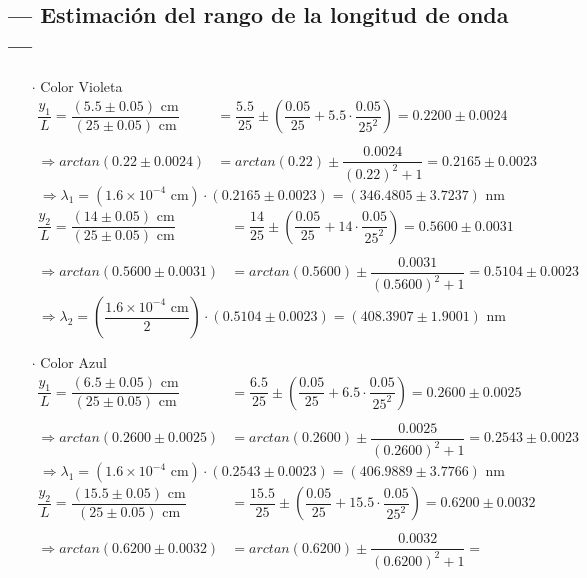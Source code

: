 \documentclass[12pt,a4paper]{article}
\begin{document}
\newpage

\subsection{--- Estimación del rango de la longitud de onda ---}
\begin{itemize}
\item [$\cdot$] Color Violeta
\begin{align*}
\dfrac{y_1}{L}=\dfrac{(5.5\pm 0.05)\mbox{ cm}}{(25\pm 0.05)\mbox{ cm}}&=
\dfrac{5.5}{25}\pm\left(\dfrac{0.05}{25}+5.5\cdot\dfrac{0.05}{25^2}\right)=
0.2200\pm0.0024 \\\\
\Longrightarrow arctan(0.22\pm0.0024)&=
arctan(0.22)\pm\dfrac{0.0024}{(0.22)^2+1}=
0.2165\pm 0.0023
\end{align*}
$$\Longrightarrow \lambda_1=
(1.6\times 10^{-4}\mbox{ cm})\cdot
(0.2165\pm 0.0023)=(346.4805\pm 3.7237)\mbox{ nm}$$
\begin{align*}
\dfrac{y_2}{L}=\dfrac{(14\pm 0.05)\mbox{ cm}}{(25\pm 0.05)\mbox{ cm}}&=
\dfrac{14}{25}\pm\left(\dfrac{0.05}{25}+14\cdot\dfrac{0.05}{25^2}\right)=
0.5600\pm0.0031 \\\\
\Longrightarrow arctan(0.5600\pm0.0031)&=
arctan(0.5600)\pm\dfrac{0.0031}{(0.5600)^2+1}=
0.5104\pm 0.0023
\end{align*}
$$\Longrightarrow \lambda_2=
\left(\dfrac{1.6\times 10^{-4}\mbox{ cm}}{2}\right)\cdot
(0.5104\pm 0.0023 )=(408.3907\pm1.9001 )\mbox{ nm}$$
\item [$\cdot$] Color Azul
\begin{align*}
\dfrac{y_1}{L}=\dfrac{(6.5\pm 0.05)\mbox{ cm}}{(25\pm 0.05)\mbox{ cm}}&=
\dfrac{6.5}{25}\pm\left(\dfrac{0.05}{25}+6.5\cdot\dfrac{0.05}{25^2}\right)=
0.2600\pm0.0025 \\\\
\Longrightarrow arctan(0.2600\pm0.0025)&=
arctan(0.2600)\pm\dfrac{0.0025}{(0.2600)^2+1}=
0.2543\pm0.0023 
\end{align*}
$$\Longrightarrow \lambda_1=
(1.6\times 10^{-4}\mbox{ cm})\cdot
(0.2543\pm0.0023 )=(406.9889\pm3.7766)\mbox{ nm}$$
\begin{align*}
\dfrac{y_2}{L}=\dfrac{(15.5\pm 0.05)\mbox{ cm}}{(25\pm 0.05)\mbox{ cm}}&=
\dfrac{15.5}{25}\pm\left(\dfrac{0.05}{25}+15.5\cdot\dfrac{0.05}{25^2}\right)=
0.6200\pm0.0032 \\\\
\Longrightarrow arctan(0.6200\pm0.0032)&=
arctan(0.6200)\pm\dfrac{0.0032}{(0.6200)^2+1}=

\end{align*}
\end{itemize}
\end{document}
